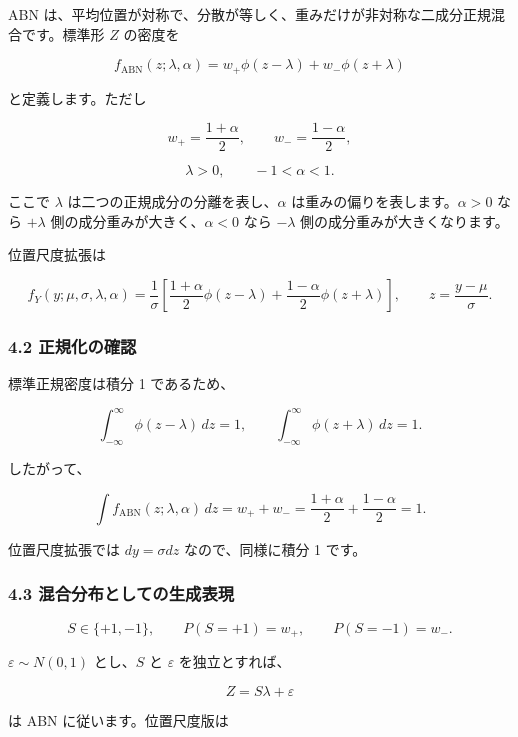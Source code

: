 \documentclass[
]{article}
\begin{document}
ABN
は、平均位置が対称で、分散が等しく、重みだけが非対称な二成分正規混合です。標準形
\(Z\) の密度を

\[
f_{\mathrm{ABN}}(z;\lambda,\alpha)
= w_+\phi(z-\lambda)+w_-\phi(z+\lambda)
\]

と定義します。ただし

\[
w_+=\frac{1+\alpha}{2},
\qquad
w_- =\frac{1-\alpha}{2},
\]

\[
\lambda>0,
\qquad
-1<\alpha<1.
\]

ここで \(\lambda\) は二つの正規成分の分離を表し、\(\alpha\)
は重みの偏りを表します。\(\alpha>0\) なら \(+\lambda\)
側の成分重みが大きく、\(\alpha<0\) なら \(-\lambda\)
側の成分重みが大きくなります。

位置尺度拡張は

\[
f_Y(y;\mu,\sigma,\lambda,\alpha)
=\frac{1}{\sigma}
\left[\frac{1+\alpha}{2}\phi(z-\lambda)
+\frac{1-\alpha}{2}\phi(z+\lambda)
\right],
\qquad
z=\frac{y-\mu}{\sigma}.
\]

\hypertarget{ux6b63ux898fux5316ux306eux78baux8a8d}{%
\subsubsection{4.2
正規化の確認}\label{ux6b63ux898fux5316ux306eux78baux8a8d}}

標準正規密度は積分 1 であるため、

\[
\int_{-\infty}^{\infty}\phi(z-\lambda)\,dz=1,
\qquad
\int_{-\infty}^{\infty}\phi(z+\lambda)\,dz=1.
\]

したがって、

\[
\int f_{\mathrm{ABN}}(z;\lambda,\alpha)\,dz
=w_++w_-=\frac{1+\alpha}{2}+\frac{1-\alpha}{2}=1.
\]

位置尺度拡張では \(dy=\sigma dz\) なので、同様に積分 1 です。

\hypertarget{ux6df7ux5408ux5206ux5e03ux3068ux3057ux3066ux306eux751fux6210ux8868ux73fe}{%
\subsubsection{4.3
混合分布としての生成表現}\label{ux6df7ux5408ux5206ux5e03ux3068ux3057ux3066ux306eux751fux6210ux8868ux73fe}}

\[
S\in\{+1,-1\},
\qquad
P(S=+1)=w_+,
\qquad
P(S=-1)=w_-.
\]

\(\varepsilon\sim N(0,1)\) とし、\(S\) と \(\varepsilon\)
を独立とすれば、

\[
Z=S\lambda+\varepsilon
\]

は ABN に従います。位置尺度版は
\end{document}
